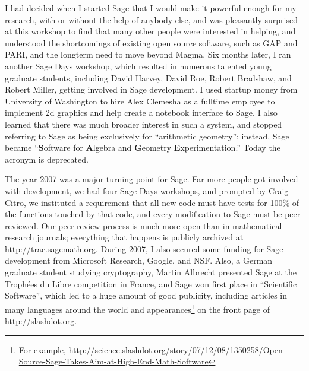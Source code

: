 \documentclass[multi]{cambridge7A}
\theoremstyle{plain}%
\theoremstyle{definition}
\begin{document}
I had decided when I started Sage that I would make it powerful enough
for my research, with or without the help of anybody else, and was
pleasantly surprised at this workshop to find that many other people were
interested in helping, and understood the  shortcomings of
existing open source software, such as GAP and PARI, and the longterm
need to move beyond Magma.
Six months later, I ran another Sage Days workshop, which resulted in
numerous talented young graduate students, including David Harvey,
David Roe, Robert Bradshaw, and Robert Miller, getting involved in
Sage development.  I used startup money from University of Washington
to hire Alex Clemesha as a fulltime employee to implement 2d
graphics and help create a notebook interface to Sage.  I also learned
that there was much broader interest in such a system, and stopped
referring to Sage as being exclusively for ``arithmetic geometry'';
instead, Sage became ``{\bf S}oftware for {\bf A}lgebra and {\bf
  G}eometry {\bf E}xperimentation.''  Today the acronym is deprecated.

The year 2007 was a major turning point for Sage.  Far more people got
involved with development, we had four Sage Days workshops, and
prompted by Craig Citro, we instituted a requirement that all new code
must have tests for 100\% of the functions touched by that code, and
every modification to Sage must be peer reviewed.  Our peer review
process is much more open than in mathematical research journals;
everything that happens is publicly archived at
\url{http://trac.sagemath.org}.  During 2007, I also secured some
funding for Sage development from Microsoft Research, Google, and NSF.
Also, a German graduate student studying cryptography, Martin Albrecht
presented Sage at the Troph\'{e}es du Libre competition in France, and
Sage won first place in ``Scientific Software'', which led to a huge
amount of good publicity, including articles in many languages
around the world and appearances\footnote{For example,
  \url{http://science.slashdot.org/story/07/12/08/1350258/Open-Source-Sage-Takes-Aim-at-High-End-Math-Software}}
on the front page of \url{http://slashdot.org}.
\end{document}
